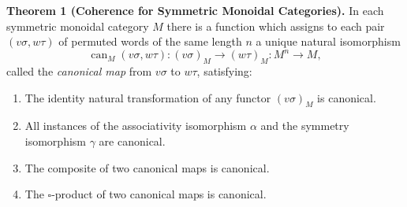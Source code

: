 \textbf{Theorem 1 (Coherence for Symmetric Monoidal Categories).}
In each symmetric monoidal category $M$ there is a function which assigns to each pair $(v\sigma, w\tau)$ of permuted words of the same length $n$ a unique natural isomorphism
$$\operatorname{can}_M(v\sigma, w\tau) : (v\sigma)_M \longrightarrow (w\tau)_M : M^n \to M,$$
called the \emph{canonical map} from $v\sigma$ to $w\tau$, satisfying:
\begin{enumerate}
\item The identity natural transformation of any functor $(v\sigma)_M$ is canonical.
\item All instances of the associativity isomorphism $\alpha$ and the symmetry isomorphism $\gamma$ are canonical.
\item The composite of two canonical maps is canonical.
\item The $\square$-product of two canonical maps is canonical.
\end{enumerate}
